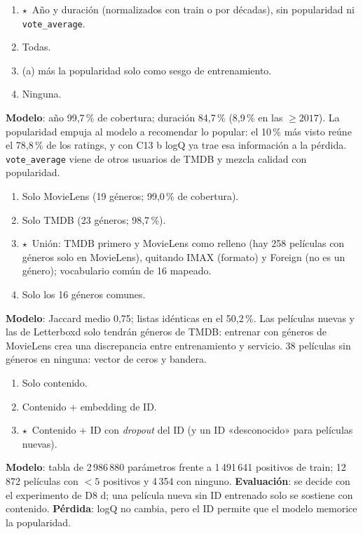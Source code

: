 \documentclass[a4paper,11pt]{article}
\newcommand{\rec}{\ensuremath{\star}}
\begin{document}
\begin{enumerate}[label=\alph*)]
  \item \rec\ Año y duración (normalizados con train o por décadas), sin popularidad ni \texttt{vote\_average}.
  \item Todas.
  \item (a) más la popularidad solo como sesgo de entrenamiento.
  \item Ninguna.
\end{enumerate}
\textbf{Modelo}: año 99,7\,\% de cobertura; duración 84,7\,\% (8,9\,\% en las $\ge2017$). La popularidad empuja al modelo a recomendar lo popular: el 10\,\% más visto reúne el 78,8\,\% de los ratings, y
con C13 b logQ ya trae esa información a la pérdida. \texttt{vote\_average} viene de otros usuarios de TMDB y mezcla calidad con popularidad.

\begin{enumerate}[label=\alph*)]
  \item Solo MovieLens (19 géneros; 99,0\,\% de cobertura).
  \item Solo TMDB (23 géneros; 98,7\,\%).
  \item \rec\ Unión: TMDB primero y MovieLens como relleno (hay 258 películas con géneros solo en MovieLens), quitando IMAX (formato) y Foreign (no es un género); vocabulario común de 16 mapeado.
  \item Solo los 16 géneros comunes.
\end{enumerate}
\textbf{Modelo}: Jaccard medio 0,75; listas idénticas en el 50,2\,\%. Las películas nuevas y las de Letterboxd solo tendrán géneros de TMDB: entrenar con géneros de MovieLens crea una discrepancia entre entrenamiento y servicio.
38 películas sin géneros en ninguna: vector de ceros y bandera.

\begin{enumerate}[label=\alph*)]
  \item Solo contenido.
  \item Contenido + embedding de ID.
  \item \rec\ Contenido + ID con \emph{dropout} del ID (y un ID «desconocido» para películas nuevas).
\end{enumerate}
\textbf{Modelo}: tabla de 2\,986\,880 parámetros frente a 1\,491\,641 positivos de train; 12\,872 películas con $<5$ positivos y 4\,354 con ninguno. \textbf{Evaluación}: se decide con el experimento de D8 d; una
película nueva sin ID entrenado solo se sostiene con contenido. \textbf{Pérdida}: logQ no cambia, pero el ID permite que el modelo memorice la popularidad.
\end{document}
